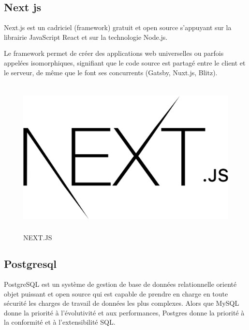 \subsection{Next js}

Next.js est un cadriciel (framework) gratuit et open source s'appuyant sur la librairie JavaScript React et sur la technologie Node.js.

Le framework permet de créer des applications web universelles ou parfois appelées isomorphiques, signifiant que le code source est partagé entre le client et le serveur, de même que le font ses concurrents (Gatsby, Nuxt.js, Blitz).

\begin{figure}[!h]
\begin{center}
\includegraphics[height=8cm]{Nextjs.svg.png}
\end{center}
\caption{NEXT.JS}
\end{figure}

\subsection{Postgresql}

PostgreSQL est un système de gestion de base de données relationnelle orienté objet puissant et open source qui est capable de prendre en charge en toute sécurité les charges de travail de données les plus complexes. Alors que MySQL donne la priorité à l'évolutivité et aux performances, Postgres donne la priorité à la conformité et à l'extensibilité SQL.

